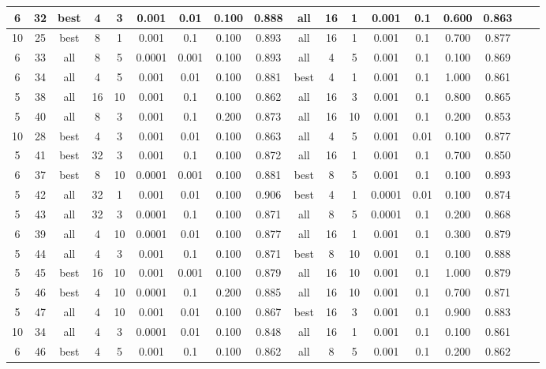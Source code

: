 \begin{table*}[!h]
\begin{tabular}{|c|c||c|c|c|c|c|c|c||c|c|c|c|c|c|c|c|c|}
6 & 32 & best & 4 & 3 & 0.001 & 0.01 & 0.100 & 0.888 &all & 16 & 1 & 0.001 & 0.1 & 0.600 & 0.863 \\ \hline
10 & 25 & best & 8 & 1 & 0.001 & 0.1 & 0.100 & 0.893 &all & 16 & 1 & 0.001 & 0.1 & 0.700 & 0.877 \\ \hline
6 & 33 & all & 8 & 5 & 0.0001 & 0.001 & 0.100 & 0.893 &all & 4 & 5 & 0.001 & 0.1 & 0.100 & 0.869 \\ \hline
6 & 34 & all & 4 & 5 & 0.001 & 0.01 & 0.100 & 0.881 &best & 4 & 1 & 0.001 & 0.1 & 1.000 & 0.861 \\ \hline
5 & 38 & all & 16 & 10 & 0.001 & 0.1 & 0.100 & 0.862 &all & 16 & 3 & 0.001 & 0.1 & 0.800 & 0.865 \\ \hline
5 & 40 & all & 8 & 3 & 0.001 & 0.1 & 0.200 & 0.873 &all & 16 & 10 & 0.001 & 0.1 & 0.200 & 0.853 \\ \hline
10 & 28 & best & 4 & 3 & 0.001 & 0.01 & 0.100 & 0.863 &all & 4 & 5 & 0.001 & 0.01 & 0.100 & 0.877 \\ \hline
5 & 41 & best & 32 & 3 & 0.001 & 0.1 & 0.100 & 0.872 &all & 16 & 1 & 0.001 & 0.1 & 0.700 & 0.850 \\ \hline
6 & 37 & best & 8 & 10 & 0.0001 & 0.001 & 0.100 & 0.881 &best & 8 & 5 & 0.001 & 0.1 & 0.100 & 0.893 \\ \hline
5 & 42 & all & 32 & 1 & 0.001 & 0.01 & 0.100 & 0.906 &best & 4 & 1 & 0.0001 & 0.01 & 0.100 & 0.874 \\ \hline
5 & 43 & all & 32 & 3 & 0.0001 & 0.1 & 0.100 & 0.871 &all & 8 & 5 & 0.0001 & 0.1 & 0.200 & 0.868 \\ \hline
6 & 39 & all & 4 & 10 & 0.0001 & 0.01 & 0.100 & 0.877 &all & 16 & 1 & 0.001 & 0.1 & 0.300 & 0.879 \\ \hline
5 & 44 & all & 4 & 3 & 0.001 & 0.1 & 0.100 & 0.871 &best & 8 & 10 & 0.001 & 0.1 & 0.100 & 0.888 \\ \hline
5 & 45 & best & 16 & 10 & 0.001 & 0.001 & 0.100 & 0.879 &all & 16 & 10 & 0.001 & 0.1 & 1.000 & 0.879 \\ \hline
5 & 46 & best & 4 & 10 & 0.0001 & 0.1 & 0.200 & 0.885 &all & 16 & 10 & 0.001 & 0.1 & 0.700 & 0.871 \\ \hline
5 & 47 & all & 4 & 10 & 0.001 & 0.01 & 0.100 & 0.867 &best & 16 & 3 & 0.001 & 0.1 & 0.900 & 0.883 \\ \hline
10 & 34 & all & 4 & 3 & 0.0001 & 0.01 & 0.100 & 0.848 &all & 16 & 1 & 0.001 & 0.1 & 0.100 & 0.861 \\ \hline
6 & 46 & best & 4 & 5 & 0.001 & 0.1 & 0.100 & 0.862 &all & 8 & 5 & 0.001 & 0.1 & 0.200 & 0.862 \\ \hline

\end{tabular}
\end{table*}
